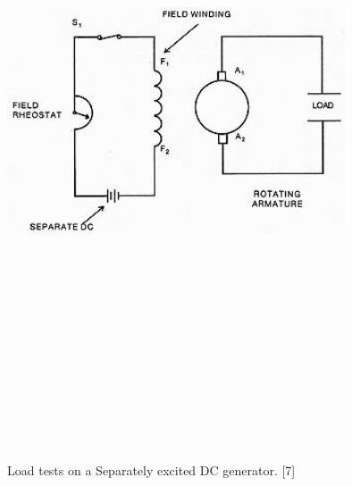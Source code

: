 \begin{center}
\begin{figure}
 \includegraphics[width=10cm,height=20cm,keepaspectratio]{2.png}
\caption{Load tests on a Separately excited DC generator. [7]}
\label{Fig:2}    
\end{figure}
\end{center}

